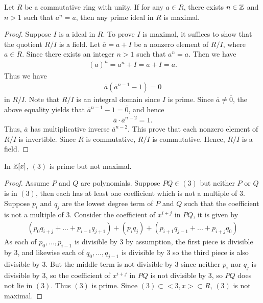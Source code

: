 \begin{exercise}{}{}
    Let $R$ be a commutative ring with unity. If for any $a\in R$, 
    there exists $n\in\mathbb{Z}$ and $n>1$ such that $a^n=a$, then any prime ideal in $R$ is maximal.
\end{exercise}
\begin{proof}
    Suppose $I$ is a ideal in $R$. To prove $I$ is maximal, it suffices to 
    show that the quotient $R/I$ is a field.
    Let $\overline{a}=a+I$ be a nonzero element of $R/I$, where $a\in R$.
    Since there exists an integer $n>1$ such that $a^n=a$.
    Then we have 
    \begin{align*}
        (\overline{a})^n=a^n+I=a+I=\overline{a}.
    \end{align*}
    Thus we have
    \begin{align*}
        \overline{a}(\overline{a}^{n-1}-1)=0
    \end{align*}
    in $R/I$.
    Note that $R/I$ is an integral domain since $I$ is prime.
    Since $\overline{a}\neq \overline{0}$, the above equality yields that $\overline{a}^{n-1}-1=\overline{0}$, and hence
    \begin{align*}
        \overline{a}\cdot \overline{a}^{n-2}=1.
    \end{align*}
    Thus, $\overline{a}$ has multiplicative inverse $\overline{a}^{n-2}$.
    This prove that each nonzero element of $R/I$ is invertible. 
    Since $R$ is commutative, $R/I$ is commutative. Hence, $R/I$ is a field.
\end{proof}


\begin{exercise}{}{}
    In $\mathbb{Z}[x]$, $(3)$ is prime but not maximal.
\end{exercise}

\begin{proof}
    Assume $P$ and $Q$ are polynomials. Suppose $PQ\in (3)$ but neither $P$ or $Q$ is in $(3)$,
    then each has at least one coefficient which is not a multiple of $3$. 
    Suppose $p_i$ and $q_j$ are the lowest degree term of $P$ and $Q$ such that the coefficient is
    not a multiple of $3$.
    Consider the coefficient of $x^{i+j}$ in $PQ$, it is given by
    \begin{align*}
        (p_0q_{i+j}+...+p_{i-1}q_{j+1})+(p_iq_j)+(p_{i+1}q_{j-1}+...+p_{i+j}q_0)
    \end{align*}
    As each of $p_0,...,p_{i-1}$ is divisible by $3$ by assumption, the first piece is divisible by $3$, 
    and likewise each of $q_0,...,q_{j-1}$ is divisible by $3$ so the third piece is also divisible by $3$. 
    But the middle term is not divisible by $3$ since neither $p_i$ nor $q_j$
    is divisible by $3$, so the coefficient of $x^{i+j}$
    in $PQ$ is not divisible by $3$, so $PQ$
    does not lie in $(3)$. Thus $(3)$ is prime. 
    Since $(3)\subset <3,x>\subset R$, $(3)$ is not maximal.  
\end{proof}

